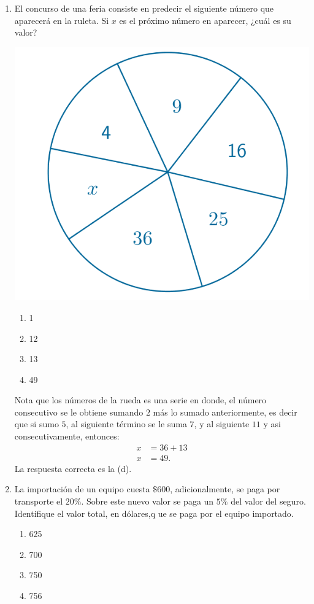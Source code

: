 \documentclass[11pt, a4paper]{article} %
\theoremstyle{dotlessP}
\theoremstyle{dotlessS}
\begin{document}
\begin{enumerate}[label=\color{dg}\theenumi.]
 \item {\color{db}El concurso de una feria consiste en predecir el siguiente número que aparecerá en la ruleta. Si \(x\) es el próximo número en aparecer, ¿cuál es su valor?
 \begin{center}
  		\includegraphics[scale=1]{SerBachiller23_fig1}
  \end{center}
   \begin{enumerate}
       		\item 1
       		\item 12
       		\item 13
       		\item 49
       \end{enumerate}
}   
  Nota que los números de la rueda es una serie en donde, el número consecutivo se le obtiene sumando \(2\) más lo sumado anteriormente, es decir que si sumo \(5\), al siguiente término se le suma \(7\), y al siguiente \(11\) y asi consecutivamente, entonces:
  \begin{align*}
  	x&= 36 + 13\\
    x&= 49.
  \end{align*}
  {\color{dh} La respuesta correcta es la (d).}
  
  \item {\color{db}La importación de un equipo cuesta \(\$ 600\), adicionalmente, se paga por transporte el \( 20 \%\). Sobre este nuevo valor se paga un \(5\%\) del valor del seguro. Identifique el valor total, en dólares,q ue se paga por el equipo importado.  
   \begin{enumerate}
       		\item 625
       		\item 700
       		\item 750
       		\item 756
       \end{enumerate}
}   


\end{enumerate}
\end{document}

